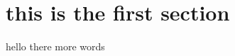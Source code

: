 \documentclass[11pt]{article}
\begin{document}
\section{this is the first section}

hello there more words
\end{document}
